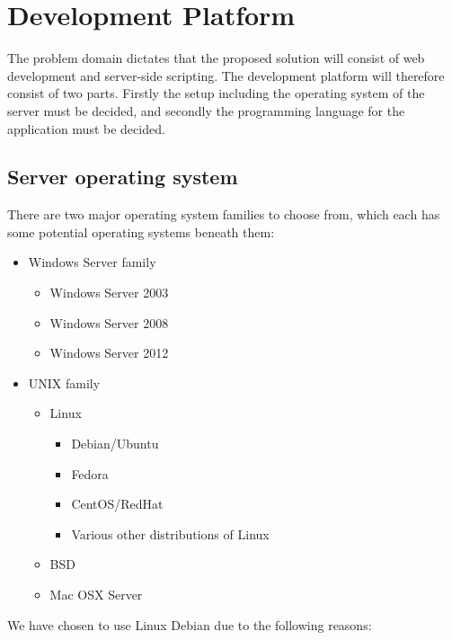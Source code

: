 \section{Development Platform}
The problem domain dictates that the proposed solution will consist of web development and server-side scripting.
The development platform will therefore consist of two parts.
Firstly the setup including the operating system of the server must be decided, and secondly the programming language for the application must be decided.

\subsection{Server operating system}
There are two major operating system families to choose from, which each has some potential operating systems beneath them:

\begin{itemize}
	\item Windows Server family
		\begin{itemize}
			\item Windows Server 2003
			\item Windows Server 2008
			\item Windows Server 2012
		\end{itemize}
	\item UNIX family
		\begin{itemize}
			\item Linux
				\begin{itemize}
					\item Debian/Ubuntu
					\item Fedora
					\item CentOS/RedHat
					\item Various other distributions of Linux
				\end{itemize}
			\item BSD
			\item Mac OSX Server
		\end{itemize}
\end{itemize}

We have chosen to use Linux Debian due to the following reasons:

